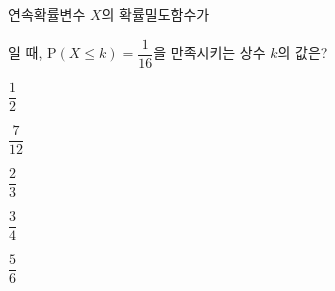 연속확률변수 $X$의 확률밀도함수가\par\smallskip{}\par\smallskip\noindent 일 때, $\mathrm{P}(X\le k)=\dfrac{1}{16}$을 만족시키는 상수 $k$의 값은?
\begin{choicesii}{\rule[-3ex]{0pt}{8ex}$\dfrac{1}{2}$}{\rule[-3ex]{0pt}{8ex}$\dfrac{7}{12}$}{\rule[-3ex]{0pt}{8ex}$\dfrac{2}{3}$}{\rule[-3ex]{0pt}{8ex}$\dfrac{3}{4}$}{\rule[-3ex]{0pt}{8ex}$\dfrac{5}{6}$}\end{choicesii}
